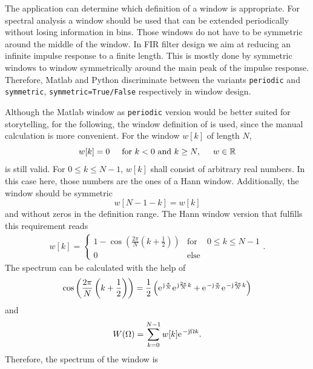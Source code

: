 \documentclass[11pt,a4paper,DIV=12]{scrartcl}
\begin{document}
The application can determine which definition of a window is appropriate.
%
For spectral analysis a window should be used that can be extended periodically
without losing information in bins.
%
Those windows do not have to be symmetric around the middle of the window.
%
In FIR filter design we aim at reducing an infinite impulse response to a
finite length.
%
This is mostly done by symmetric windows to window symmetrically around the main
peak of the impulse response.
%
Therefore, Matlab and Python discriminate between the variants \texttt{periodic} and
\texttt{symmetric},  \texttt{symmetric=True/False} respectively in window design.

Although the Matlab window as \texttt{periodic} version would be better suited
for storytelling, for the following, the window definition of \cite{Moeser2011}
is used, since the manual calculation is more convenient.
%
For the window $w[k]$ of length $N$,
%
\begin{equation}
w[k]=0 \hspace{5mm} \text{for}\,\,k<0\,\,\text{and}\,\,k\geq N,
\hspace{5mm} w\in\mathbb{R}
\end{equation}
%
is still valid.
%
For $0\leq k\leq N-1$, $w[k]$ shall consist of arbitrary real numbers.
%
In this case here, those numbers are the ones of a Hann window.
%
Additionally, the window should be symmetric
%
\begin{equation}
w[N-1-k]=w[k]
\end{equation}
%
and without zeros in the definition range.
%
The Hann window version that fulfills this requirement reads
%
\begin{align}
w[k]=\left\{\begin{matrix}1-\cos\left(\frac{2\pi}{N}\left(k+\frac{1}{2}\right)\right) & \text{for} & 0\leq k\leq N-1\\0 & \text{else} & \end{matrix}\right..
\label{eq:hanning}
\end{align}
%
The spectrum can be calculated with the help of
\begin{equation}
\cos\left(\frac{2\pi}{N}\left(k+\frac{1}{2}\right)\right)=\frac{1}{2}\left(\e^{\im\frac{\pi}{N}}\e^{\im\frac{2\pi}{N}k}+\e^{-\im\frac{\pi}{N}}\e^{-\im\frac{2\pi}{N}k}\right)
\end{equation}
%
and
%
\begin{equation}
W(\Omega)=\sum\limits_{k=0}^{N-1}w[k]\e^{-\im\Omega k}.
\end{equation}
%
Therefore, the spectrum of the window is
\end{document}
